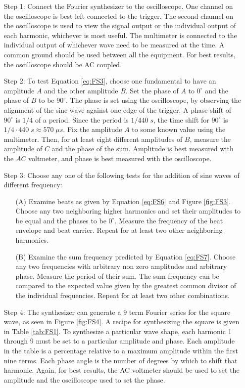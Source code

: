 \begin{itemize}[leftmargin = 50pt]
    \item[Step 1:] Connect the Fourier synthesizer to the oscilloscope. One channel on the oscilloscope is best left connected to the trigger. The second channel on the oscilloscope is used to view the signal output or the individual output of each harmonic, whichever is most useful. The multimeter is connected to the individual output of whichever wave need to be measured at the time. A common ground should be used between all the equipment. For best results, the oscilloscope should be AC coupled.
    \item[Step 2:] To test Equation \ref{eq:FS3}, choose one fundamental to have an amplitude $A$ and the other amplitude $B$. Set the phase of $A$ to $0^{\circ}$ and the phase of $B$ to be $90^{\circ}$. The phase is set using the oscilloscope, by observing the alignment of the sine wave against one edge of the trigger. A phase shift of $90^{\circ}$ is $1/4$ of a period. Since the period is $1/440\;s$, the time shift for $90^{\circ}$ is $1/4\cdot440\;s \approx 570\;\mu s$. Fix the amplitude $A$ to some known value using the multimeter. Then, for at least eight different amplitudes of $B$, measure the amplitude of $C$ and the phase of the sum. Amplitude is best measured with the $AC$ voltmeter, and phase is best measured with the oscilloscope.
    \item[Step 3:] Choose any one of the following tests for the addition of sine waves of different frequency:
        \begin{enumerate}
            \item[(A)] Examine beats as given by Equation \ref{eq:FS6} and Figure \ref{fig:FS3}. Choose any two neighboring higher harmonics and set their amplitudes to be equal and the phases to be $0^{\circ}$. Measure the frequency of the beat envelope and beat carrier. Repeat for at least two other neighboring harmonics.
            \item[(B)] Examine the sum frequency predicted by Equation \ref{eq:FS7}. Choose any two frequencies with arbitrary non zero amplitudes and arbitrary phase. Measure the period of their sum. The sum frequency can be compared to the expected value given by the greatest common divisor of the individual frequencies. Repeat for at least two other combinations.
        \end{enumerate}
    \item[Step 4:] The synthesizer can generate a $9$ term Fourier series for the square wave, as seen in Figure \ref{fig:FS4}. A recipe for synthesizing the square is given in Table \ref{tab:FS1}. To synthesize a particular wave shape, each harmonic 1 through 9 must be set to a particular amplitude and phase. Each amplitude in the table is a percentage relative to a maximum amplitude within the first nine terms. Each phase angle is the number of degrees by which to shift that harmonic. Again, for best results, the AC voltmeter should be used to set the amplitude and the oscilloscope used to set the phase. 
        

\end{itemize}
